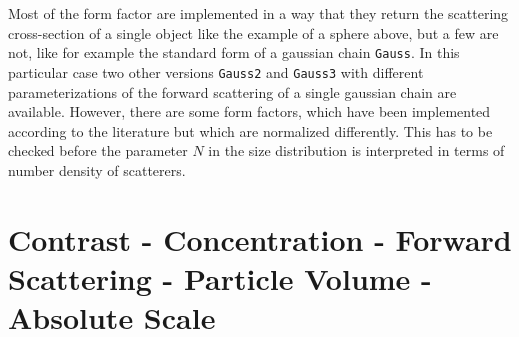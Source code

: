 Most of the form factor are implemented in a way that they return
the scattering cross-section of a single object like the example of
a sphere above, but a few are not, like for example the standard
form of a gaussian chain \texttt{Gauss}. In this particular case two
other versions \texttt{Gauss2} and \texttt{Gauss3} with different
parameterizations of the forward scattering of a single gaussian
chain are available. However, there are some form factors, which
have been implemented according to the literature but which are
normalized differently. This has to be checked before the parameter
$N$ in the size distribution is interpreted in terms of number
density of scatterers.

\section{Contrast - Concentration - Forward Scattering - Particle Volume - Absolute Scale}
\label{sec:contrast-concentration-I(0)}

